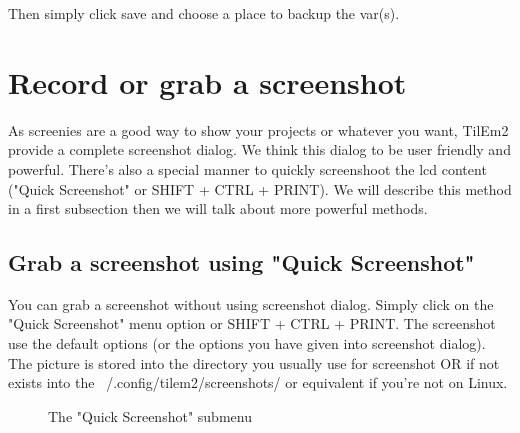 \documentclass[10pt]{report}
\begin{document}
Then simply click save and choose a place to backup the var(s).\newline


\section{Record or grab a screenshot}

As screenies are a good way to show your projects or whatever you want, TilEm2 provide a complete screenshot dialog.\newline
We think this dialog to be user friendly and powerful.\newline
There's also a special manner to quickly screenshoot the lcd content ("Quick Screenshot" or SHIFT + CTRL + PRINT).\newline
We will describe this method in a first subsection then we will talk about more powerful methods.\newline

\subsection{Grab a screenshot using "Quick Screenshot"}

You can grab a screenshot without using screenshot dialog.\newline
Simply click on the "Quick Screenshot" menu option or SHIFT + CTRL + PRINT.\newline
The screenshot use the default options (or the options you have given into screenshot dialog).\newline
The picture is stored into the directory you usually use for screenshot OR if not exists into the ~/.config/tilem2/screenshots/ or equivalent if you're not on Linux.\newline

\begin{figure}[H]
\centering
{}
\caption{The "Quick Screenshot" submenu}
\end{figure}
\end{document}

